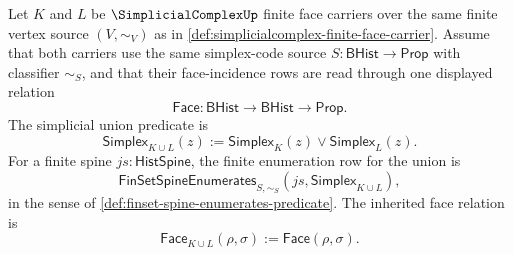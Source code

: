 \begin{definition}
\label{def:simplicialcomplex-union-carrier-rows}
Let $K$ and $L$ be $\SimplicialComplexUp$ finite face carriers over the same finite vertex source $(V,\sim_V)$ as in \autoref{def:simplicialcomplex-finite-face-carrier}. Assume that both carriers use the same simplex-code source $S:\mathsf{BHist}\to\mathsf{Prop}$ with classifier $\sim_S$, and that their face-incidence rows are read through one displayed relation
$$
\mathsf{Face}:\mathsf{BHist}\to\mathsf{BHist}\to\mathsf{Prop}.
$$
The simplicial union predicate is
$$
\mathsf{Simplex}_{K\cup L}(z):=
\mathsf{Simplex}_K(z)\vee\mathsf{Simplex}_L(z).
$$
For a finite spine $js:\mathsf{HistSpine}$, the finite enumeration row for the union is
$$
\mathsf{FinSetSpineEnumerates}_{S,\sim_S}(js,\mathsf{Simplex}_{K\cup L}),
$$
in the sense of \autoref{def:finset-spine-enumerates-predicate}. The inherited face relation is
$$
\mathsf{Face}_{K\cup L}(\rho,\sigma):=\mathsf{Face}(\rho,\sigma).
$$
\end{definition}

